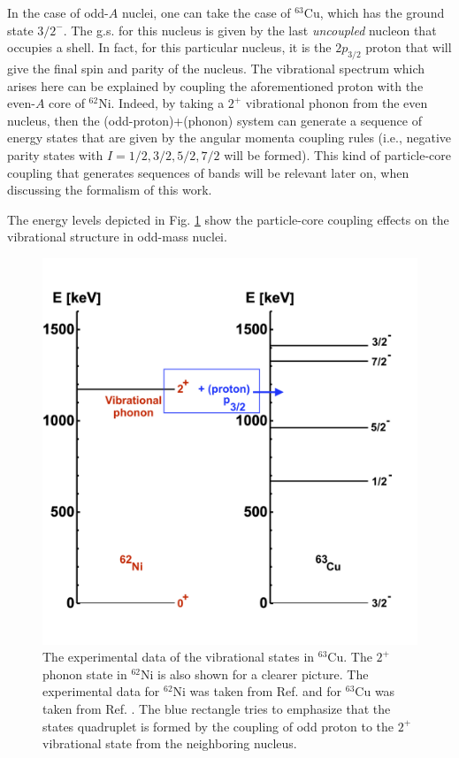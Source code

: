 In the case of odd-$A$ nuclei, one can take the case of $^{63}$Cu, which has the ground state $3/2^{-}$. The g.s. for this nucleus is given by the last \emph{uncoupled} nucleon that occupies a shell. In fact, for this particular nucleus, it is the $2p_{3/2}$ proton that will give the final spin and parity of the nucleus. The vibrational spectrum which arises here can be explained by coupling the aforementioned proton with the even-$A$ core of $^{62}$Ni. Indeed, by taking a $2^+$ vibrational phonon from the even nucleus, then the (odd-proton)+(phonon) system can generate a sequence of energy states that are given by the angular momenta coupling rules (i.e., negative parity states with $I=1/2,3/2,5/2,7/2$ will be formed). This kind of particle-core coupling that generates sequences of bands will be relevant later on, when discussing the formalism of this work.

The energy levels depicted in Fig. \ref{energy-levels-63Cu-virbational-band} show the particle-core coupling effects on the vibrational structure in odd-mass nuclei.

\begin{figure}
    \centering
    \includegraphics[scale=0.155]{Chapters/Figures/63Cu_vib_experimental.png}
    \caption{The experimental data of the vibrational states in $^{63}$Cu. The $2^+$ phonon state in $^{62}$Ni is also shown for a clearer picture. The experimental data for $^{62}$Ni was taken from Ref. \cite{nichols2012nuclear} and for $^{63}$Cu was taken from Ref. \cite{erjun2001nuclear}. The blue rectangle tries to emphasize that the states quadruplet is formed by the coupling of odd proton to the $2^+$ vibrational state from the neighboring nucleus.}
    \label{energy-levels-63Cu-virbational-band}
\end{figure}

